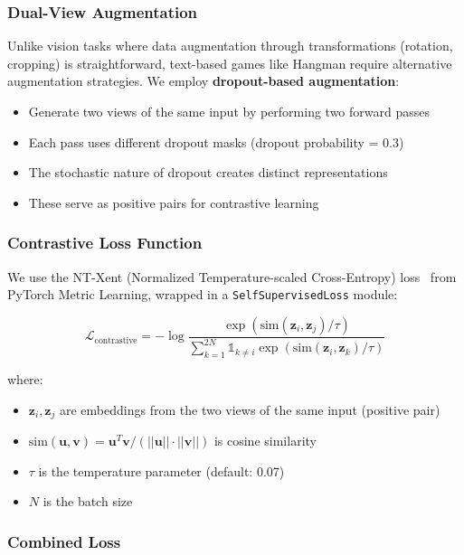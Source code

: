 \documentclass[12pt,a4paper]{article}
\begin{document}
\subsubsection{Dual-View Augmentation}

Unlike vision tasks where data augmentation through transformations (rotation, cropping) is straightforward, text-based games like Hangman require alternative augmentation strategies. We employ \textbf{dropout-based augmentation}:

\begin{itemize}
    \item Generate two views of the same input by performing two forward passes
    \item Each pass uses different dropout masks (dropout probability = 0.3)
    \item The stochastic nature of dropout creates distinct representations
    \item These serve as positive pairs for contrastive learning
\end{itemize}

\subsubsection{Contrastive Loss Function}

We use the NT-Xent (Normalized Temperature-scaled Cross-Entropy) loss~\cite{gao2021simcse} from PyTorch Metric Learning, wrapped in a \texttt{SelfSupervisedLoss} module:

\begin{equation}
\mathcal{L}_{\text{contrastive}} = -\log \frac{\exp(\text{sim}(\mathbf{z}_i, \mathbf{z}_j) / \tau)}{\sum_{k=1}^{2N} \mathbb{1}_{k \neq i} \exp(\text{sim}(\mathbf{z}_i, \mathbf{z}_k) / \tau)}
\end{equation}

where:
\begin{itemize}
    \item $\mathbf{z}_i, \mathbf{z}_j$ are embeddings from the two views of the same input (positive pair)
    \item $\text{sim}(\mathbf{u}, \mathbf{v}) = \mathbf{u}^T \mathbf{v} / (||\mathbf{u}|| \cdot ||\mathbf{v}||)$ is cosine similarity
    \item $\tau$ is the temperature parameter (default: 0.07)
    \item $N$ is the batch size
\end{itemize}

\subsubsection{Combined Loss}
\end{document}
